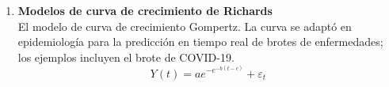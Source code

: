 \documentclass[12pt,a4paper]{report}
\begin{document}
\begin{enumerate}
\begin{enumerate}
\begin{equation*}
\begin{bmatrix}
y_{111}\\
y_{121}\\
y_{211}\\
y_{221}\\
y_{112}\\
y_{122}\\
y_{212}\\
y_{222}\\
\end{bmatrix}
=\begin{bmatrix}
1 & 1 &0& 1& 0& 1& 0& 0& 0\\
1 &1& 0& 0& 1& 0& 1& 0& 0\\
1& 0& 1& 1& 0& 0& 0& 1& 0\\
1& 0& 1& 0& 1& 0& 0& 0& 1\\
1& 1& 0& 1& 0& 1& 0& 0& 0\\
1& 1& 0& 0& 1& 0& 1& 0& 0\\
1& 0& 1& 1& 0& 0& 0& 1& 0\\
1& 0& 1& 0& 1& 0& 0& 0& 1\\
\end{bmatrix}
\begin{bmatrix}
\mu\\
\alpha_{1}\\
\alpha_{2}\\
\beta_{1}\\
\beta_{2}\\
\phi_{11}\\
\phi_{12}\\
\phi_{21}\\
\phi_{22}
\end{bmatrix}+
\begin{bmatrix}
\epsilon_{111}\\
\epsilon_{121}\\
\epsilon_{211}\\
\epsilon_{221}\\
\epsilon_{112}\\
\epsilon_{122}\\
\epsilon_{212}\\
\epsilon_{222}\\
\end{bmatrix}
\end{equation*}
Los factores, sean A y B, solo tienen dos tratamientos, por lo que se tienen cuatro interacciones posibles entre los niveles de A y B.



\end{enumerate}
\item \textbf{Modelos de curva de crecimiento de Richards}\\
El modelo de curva de crecimiento Gompertz. La curva se adaptó en epidemiología para la predicción en
tiempo real de brotes de enfermedades; los ejemplos incluyen el brote de COVID-19.\\
$$ Y(t)=ae^{-e^{-b(t-c)}}+\varepsilon_{t} $$


\end{enumerate}
\end{document}
